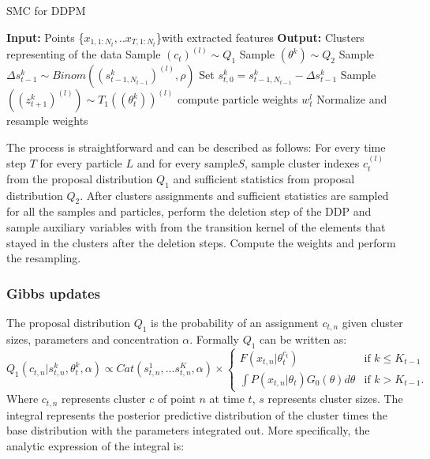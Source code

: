 \documentclass[twoside,hidelinks]{article}
\begin{document}
\begin{algorithm}[ht!]
  \caption{SMC for DDPM}\label{SMC}
  \begin{algorithmic}[1]
	\State \textbf{Input:} Points \{$x_{1,1:N_t}, ..x_{T,1:N_t}$\}with extracted features
	\State \textbf{Output:} Clusters representing of the data
								\State Sample $(c_t)^{(l)} \sim Q_1$  
								\State Sample $(\theta^k ) \sim Q_2$
						    \EndFor		
			   \State Sample $\Delta s_{t-1}^k \sim Binom( (s_{t-1,N_{t-1}}^k)^{(l)}, \rho) $ 
		       \State Set $s_{t,0}^{k} = s_{t-1,N_{t-1}}^{k} -\Delta s_{t-1}^k$
   		       \State Sample $( (z_{t+1}^k)^{(l)} ) \sim T_1((\theta_t^k))^{(l)} $
		    \EndFor
		 	\State compute particle weights $w_t^l$
		    \EndFor
    \State Normalize and resample weights
    \EndFor
  \end{algorithmic}
\end{algorithm}

The process is straightforward and can be described as follows:
For every time step $T$ for every particle $L$ and for every sample$S$, sample cluster indexes $c_t^{(l)}$ from the proposal distribution $Q_1$ and sufficient statistics from proposal distribution $Q_2$. After clusters assignments and sufficient statistics are sampled for all the samples and particles, perform the deletion step of the DDP and sample auxiliary variables with from the transition kernel of the elements that stayed in the clusters after the deletion steps. Compute the weights and perform the resampling. 

\subsubsection{Gibbs updates}
The proposal distribution $Q_1$ is the probability of an assignment $c_{t,n}$ given cluster sizes, parameters and concentration $\alpha$. Formally $Q_1$ can be written as:
\begin{equation} \label{Gibbs}
 Q_1(c_{t,n} | s_{t,n}^k, \theta_t^k, \alpha) \propto Cat( s_{t,n}^1,...s_{t,n}^K, \alpha ) \times
 	\begin{cases} 
 	F(x_{t,n} | \theta_t^{c_t} )  &\mbox{if } k \leq K_{t-1} \\
 	\int P(x_{t,n} | \theta_t )G_0(\theta) d\theta & \mbox{if } k > K_{t-1}. \end{cases}
\end{equation}
Where $c_{t,n}$ represents cluster $c$ of point $n$ at time $t$, $s$ represents cluster sizes. The integral represents the posterior predictive distribution of the cluster times the base distribution with the parameters integrated out. More specifically, the analytic expression of the integral is:
\end{document}
